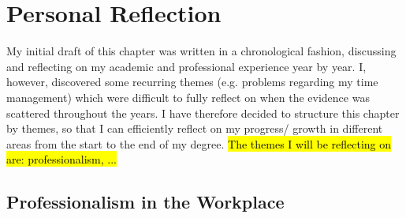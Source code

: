 \chapter{Personal Reflection} %

\label{Chapter4} %



My initial draft of this chapter was written in a chronological fashion, discussing and reflecting on my academic and professional experience year by year.
I, however, discovered some recurring themes (e.g. problems regarding my time management) which were difficult to fully reflect on when the evidence was scattered throughout the years.
I have therefore decided to structure this chapter by themes, so that I can efficiently reflect on my progress/ growth in different areas from the start to the end of my degree.
\hl{The themes I will be reflecting on are: professionalism, ...}



\section{Professionalism in the Workplace}

